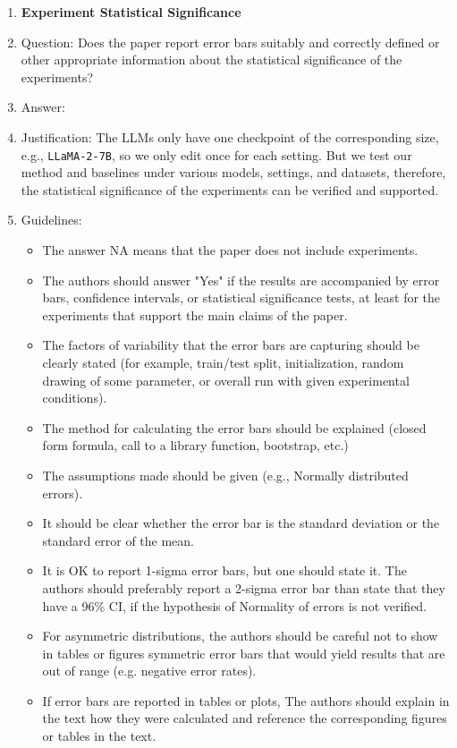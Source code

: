 \documentclass{article}
\begin{document}
\begin{enumerate}
\item {\bf Experiment Statistical Significance}
    \item[] Question: Does the paper report error bars suitably and correctly defined or other appropriate information about the statistical significance of the experiments?
    \item[] Answer: \answerYes{} %
    \item[] Justification: The LLMs only have one checkpoint of the corresponding size, e.g., \texttt{LLaMA-2-7B}, so we only edit once for each setting. But we test our method and baselines under various models, settings, and datasets, therefore, the statistical significance of the experiments can be verified and supported.
    \item[] Guidelines:
    \begin{itemize}
        \item The answer NA means that the paper does not include experiments.
        \item The authors should answer "Yes" if the results are accompanied by error bars, confidence intervals, or statistical significance tests, at least for the experiments that support the main claims of the paper.
        \item The factors of variability that the error bars are capturing should be clearly stated (for example, train/test split, initialization, random drawing of some parameter, or overall run with given experimental conditions).
        \item The method for calculating the error bars should be explained (closed form formula, call to a library function, bootstrap, etc.)
        \item The assumptions made should be given (e.g., Normally distributed errors).
        \item It should be clear whether the error bar is the standard deviation or the standard error of the mean.
        \item It is OK to report 1-sigma error bars, but one should state it. The authors should preferably report a 2-sigma error bar than state that they have a 96\% CI, if the hypothesis of Normality of errors is not verified.
        \item For asymmetric distributions, the authors should be careful not to show in tables or figures symmetric error bars that would yield results that are out of range (e.g. negative error rates).
        \item If error bars are reported in tables or plots, The authors should explain in the text how they were calculated and reference the corresponding figures or tables in the text.
    \end{itemize}


\end{enumerate}
\end{document}
